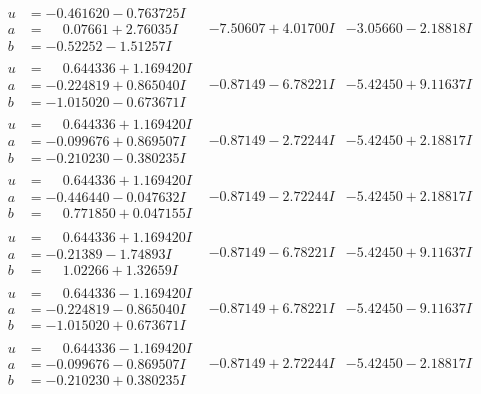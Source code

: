 \documentclass[1p]{elsarticle_modified}
\theoremstyle{definition}
\begin{document}
$$\begin{array}{c|c|c}
\begin{aligned}
u &= -0.461620 - 0.763725 I \\
a &= \phantom{-}0.07661 + 2.76035 I \\
b &= -0.52252 - 1.51257 I\end{aligned}
 & -7.50607 + 4.01700 I & -3.05660 - 2.18818 I \\ \hline\begin{aligned}
u &= \phantom{-}0.644336 + 1.169420 I \\
a &= -0.224819 + 0.865040 I \\
b &= -1.015020 - 0.673671 I\end{aligned}
 & -0.87149 - 6.78221 I & -5.42450 + 9.11637 I \\ \hline\begin{aligned}
u &= \phantom{-}0.644336 + 1.169420 I \\
a &= -0.099676 + 0.869507 I \\
b &= -0.210230 - 0.380235 I\end{aligned}
 & -0.87149 - 2.72244 I & -5.42450 + 2.18817 I \\ \hline\begin{aligned}
u &= \phantom{-}0.644336 + 1.169420 I \\
a &= -0.446440 - 0.047632 I \\
b &= \phantom{-}0.771850 + 0.047155 I\end{aligned}
 & -0.87149 - 2.72244 I & -5.42450 + 2.18817 I \\ \hline\begin{aligned}
u &= \phantom{-}0.644336 + 1.169420 I \\
a &= -0.21389 - 1.74893 I \\
b &= \phantom{-}1.02266 + 1.32659 I\end{aligned}
 & -0.87149 - 6.78221 I & -5.42450 + 9.11637 I \\ \hline\begin{aligned}
u &= \phantom{-}0.644336 - 1.169420 I \\
a &= -0.224819 - 0.865040 I \\
b &= -1.015020 + 0.673671 I\end{aligned}
 & -0.87149 + 6.78221 I & -5.42450 - 9.11637 I \\ \hline\begin{aligned}
u &= \phantom{-}0.644336 - 1.169420 I \\
a &= -0.099676 - 0.869507 I \\
b &= -0.210230 + 0.380235 I\end{aligned}
 & -0.87149 + 2.72244 I & -5.42450 - 2.18817 I \\ \hline\begin{aligned}

\end{aligned}
\end{array}$$
\end{document}
